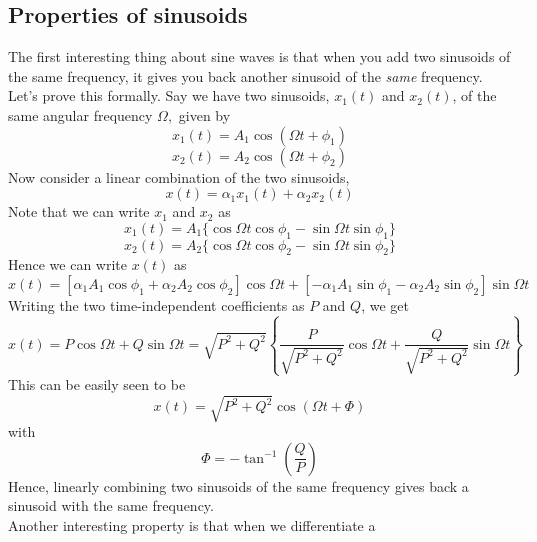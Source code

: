 \subsection{Properties of sinusoids}
The first interesting thing about sine waves is that when you add two sinusoids
of the same frequency, it gives you back another sinusoid of the \emph{same}
frequency. Let's prove this formally.
Say we have two sinusoids, $x_1 (t)$ and $x_2 (t)$, of the same angular frequency
$\Omega,$ given by
\begin{equation*}
x_1 (t) = A_1 \cos (\Omega t + \phi_1)
\end{equation*}
\begin{equation*}
x_2 (t) = A_2 \cos (\Omega t + \phi_2)
\end{equation*}
Now consider a linear combination of the two sinusoids,
\begin{equation*}
x (t) = \alpha_1 x_1 (t) + \alpha_2 x_2 (t)
\end{equation*}
Note that we can write $x_1$ and $x_2$ as
\begin{equation*}
x_1 (t) = A_1  \{ \cos \Omega t \cos \phi_1 - \sin \Omega t \sin \phi_1 \}
\end{equation*}
\begin{equation*}
x_2 (t) = A_2  \{ \cos \Omega t \cos \phi_2 - \sin \Omega t \sin \phi_2 \}
\end{equation*}
Hence we can write $x (t)$ as
\begin{equation*}
x (t) = [ \alpha_1 A_1 \cos \phi_1 + \alpha_2 A_2 \cos \phi_2 ] \cos
   \Omega t + [ - \alpha_1 A_1 \sin \phi_1 - \alpha_2 A_2 \sin
   \phi_2 ] \sin \Omega t
\end{equation*}
Writing the two time-independent coefficients as $P$ and $Q$, we get
\begin{equation*}
 x (t) = P \cos \Omega t + Q \sin \Omega t = \sqrt{P^2 + Q^2}  \left\{
   \frac{P}{\sqrt{P^2 + Q^2}} \cos \Omega t + \frac{Q}{\sqrt{P^2 + Q^2}}
   \sin \Omega t \right\}
\end{equation*}
This can be easily seen to be
\begin{equation*}
 x (t) = \sqrt{P^2 + Q^2} \cos (\Omega t + \Phi)
\end{equation*}
with
\begin{equation*}
\Phi = - \tan^{- 1} \left( \frac{Q}{P} \right)
\end{equation*}
Hence, linearly combining two sinusoids of the same frequency gives back a
sinusoid with the same frequency.\\
Another interesting property is that when we differentiate a
